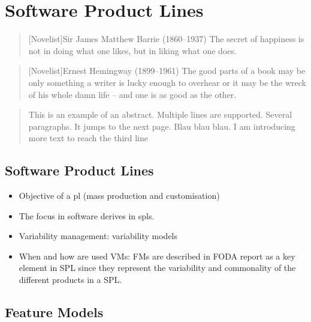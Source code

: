 \chapter{Software Product Lines}

\begin{quotation}[Novelist]{Sir James Matthew Barrie (1860--1937)}
The secret of happiness is not in doing what one likes, but in liking what one does. 
\end{quotation}

\begin{quotation}[Novelist]{Ernest Hemingway (1899--1961)}
The good parts of a book may be only something a writer is lucky enough to overhear or it may be the wreck of his whole damn life -- and one is as good as the other.
\end{quotation}

\begin{abstract}
This is an example of an abstract. Multiple lines are supported. Several paragraphs. It jumps to the next page. Blau blau blau. I am  introducing more text to reach the third line 
\end{abstract}



\section{Software Product Lines}

\begin{itemize}
\item Objective of a \Gls{pl} (mass production and customisation) \cite{benavides05-CAISE}
\item The focus in software derives in \Glspl{spl}.
\item Variability management: variability models
\item When and how are used VMs: FMs are described in FODA report as a key element in SPL since they represent the variability and commonality of the different products in a SPL.
\end{itemize}

\section{Feature Models}

